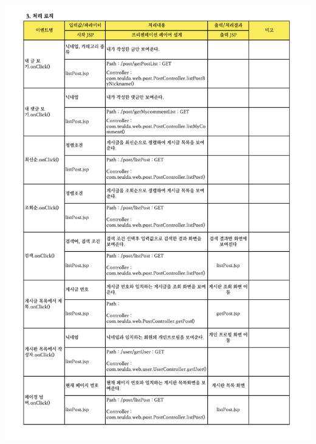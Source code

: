 {{{{{{{{{{{{{{{{{{{{{{{{{{{{{{{{{{{{{{{{{{{{{{{{{{{{{{{{\includegraphics[width=20cm]{./Figure/Design/Display/post/post_04.pdf} \\
}}}}}}}}}}}}}}}}}}}}}}}}}}}}}}}}}}}}}}}}}}}}}}}}}}}}}}}}
